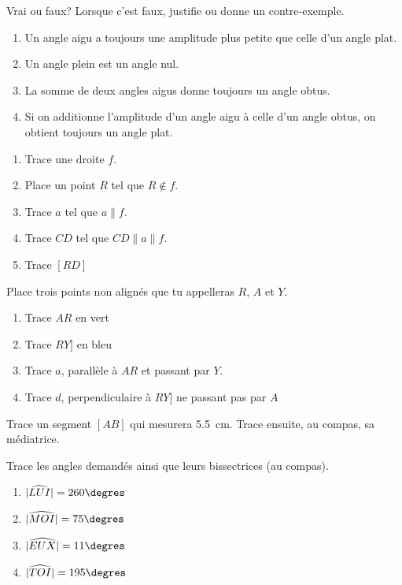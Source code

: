 \documentclass[paper=a4, twoside, fontsize=12pt, parskip=half-, numbers=enddot, open=right]{scrbook}
\begin{document}
\begin{exercise}
    Vrai ou faux? Lorsque c'est faux, justifie ou donne un contre-exemple.
    \begin{enumerate}
        \item Un angle aigu a toujours une amplitude plus petite que celle d'un angle plat.
        \item Un angle plein est un angle nul.
        \item La somme de deux angles aigus donne toujours un angle obtus.
        \item Si on additionne l'amplitude d'un angle aigu à celle d'un angle obtus, on obtient toujours un angle plat.
    \end{enumerate}
\end{exercise}

\begin{exercise}

    \begin{enumerate}[label= $\ast $]
        \item Trace une droite $f$.
        \item Place un point $R$ tel que $R \notin f$.
        \item Trace $a$ tel que $a \parallel f$.
        \item Trace $CD$ tel que $CD \parallel a \parallel f$.
        \item Trace $[RD]$
    \end{enumerate}
\end{exercise}

\begin{exercise}
    Place trois points non alignés que tu appelleras $R$, $A$ et $Y$.
    \begin{enumerate}[label= $\ast$]
        \item Trace $AR$ en vert
        \item Trace $RY]$ en bleu
        \item Trace $a$, parallèle à $AR$ et passant par $Y$.
        \item Trace $d$, perpendiculaire à $RY]$ ne passant pas par $A$
    \end{enumerate}
\end{exercise}

\begin{exercise}
    Trace un segment \([AB]\) qui mesurera \SI{5,5}{cm}. Trace ensuite, au compas, sa médiatrice.
\end{exercise}

\begin{exercise}
    Trace les angles demandés ainsi que leurs bissectrices (au compas).
    \begin{enumerate}[cols=2]
        \item \(|\widehat{LUI}|=260\degres\)
        \item \(|\widehat{MOI}|=75\degres\)
        \item \(|\widehat{EUX}|=11\degres\)
        \item \(|\widehat{TOI}|=195\degres\)
    \end{enumerate}
\end{exercise}
\end{document}

